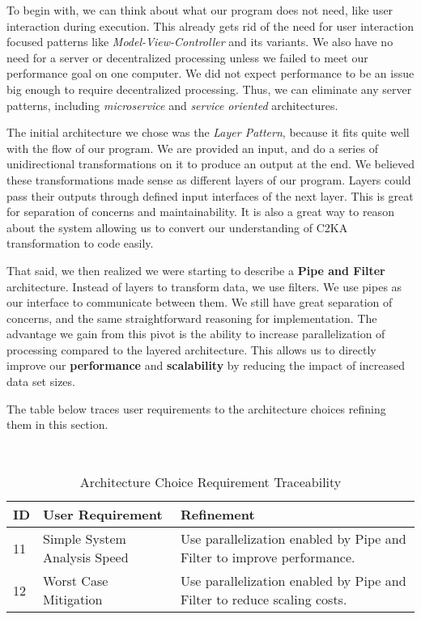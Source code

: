 \documentclass[11pt]{article}
\begin{document}
    To begin with, we can think about what our program does not need, like user interaction during execution.
    This already gets rid of the need for user interaction focused patterns like \textit{Model-View-Controller} and its variants.
    We also have no need for a server or decentralized processing unless we failed to meet our performance goal on one computer.
    We did not expect performance to be an issue big enough to require decentralized processing.
    Thus, we can eliminate any server patterns, including \textit{microservice} and \textit{service oriented} architectures.

    The initial architecture we chose was the \textit{Layer Pattern}, because it fits quite well with the flow of our program.
    We are provided an input, and do a series of unidirectional transformations on it to produce an output at the end.
    We believed these transformations made sense as different layers of our program.
    Layers could pass their outputs through defined input interfaces of the next layer.
    This is great for separation of concerns and maintainability.
    It is also a great way to reason about the system allowing us to convert our understanding of C2KA transformation to code easily.

    That said, we then realized we were starting to describe a \textbf{Pipe and Filter} architecture.
    Instead of layers to transform data, we use filters.
    We use pipes as our interface to communicate between them.
    We still have great separation of concerns, and the same straightforward reasoning for implementation.
    The advantage we gain from this pivot is the ability to increase parallelization of processing compared to the layered architecture.
    This allows us to directly improve our \textbf{performance} and \textbf{scalability} by reducing the impact of increased data set sizes.

    The table below traces user requirements to the architecture choices refining them in this section.

    \begin{table}[htbp]
        \centering
        \caption{Architecture Choice Requirement Traceability}\label{tab:arch-choice-table}\\
        \begin{tabularx}{\textwidth}{| l | l | X |}
            \hline
            \textbf{ID} & \textbf{User Requirement} & \textbf{Refinement} \\
            \hline
            11 & Simple System Analysis Speed & Use parallelization enabled by Pipe and Filter to improve performance. \\ \hline
            12 & Worst Case Mitigation & Use parallelization enabled by Pipe and Filter to reduce scaling costs.  \\ \hline
        \end{tabularx}
    \end{table}
\end{document}

